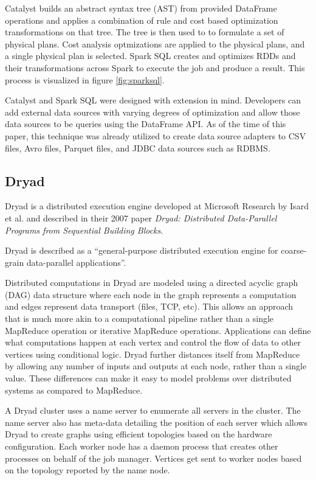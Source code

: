 \documentclass[]{article}
\begin{document}
Catalyst builds an abstract syntax tree (AST) from provided DataFrame operations and applies a combination of rule and cost based optimization transformations on that tree. The tree is then used to to formulate a set of physical plans. Cost analysis optmizations are applied to the physical plans, and a single physical plan is selected. Spark SQL creates and optimizes RDDs and their transformations across Spark to execute the job and produce a result. This process is visualized in figure \ref{fig:sparksql}.

Catalyst and Spark SQL were designed with extension in mind. Developers can add external data sources with varying degrees of optimization and allow those data sources to be queries using the DataFrame API. As of the time of this paper, this technique was already utilized to create data source adapters to CSV files, Avro files, Parquet files, and JDBC data sources such as RDBMS.

\subsection{Dryad}
Dryad is a distributed execution engine developed at Microsoft Research by Isard et al. and described in their 2007 paper \textit{Dryad: Distributed Data-Parallel Programs from Sequential Building Blocks}\cite{isard2007dryad}. 

Dryad is described as a ``general-purpose distributed execution engine for coarse-grain data-parallel applications''.

Distributed computations in Dryad are modeled using a directed acyclic graph (DAG) data structure where each node in the graph represents a computation and edges represent data transport (files, TCP, etc). This allows an approach that is much more akin to a computational pipeline rather than a single MapReduce operation or iterative MapReduce operations. Applications can define what computations happen at each vertex and control the flow of data to other vertices using conditional logic. Dryad further distances itself from MapReduce by allowing any number of inputs and outputs at each node, rather than a single value. These differences can make it easy to model problems over distributed systems as compared to MapReduce.

A Dryad cluster uses a name server to enumerate all servers in the cluster. The name server also has meta-data detailing the position of each server which allows Dryad to create graphs using efficient topologies based on the hardware configuration. Each worker node has a daemon process that creates other processes on behalf of the job manager. Vertices get sent to worker nodes based on the topology reported by the name node.
\end{document}
